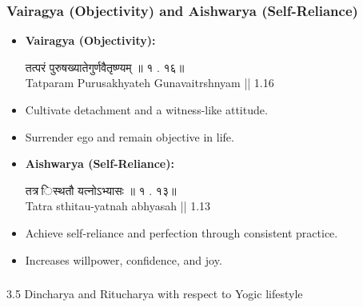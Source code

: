 \begin{frame}[fragile]\frametitle{Vairagya (Objectivity) and Aishwarya (Self-Reliance)}

      \begin{itemize}
        \item \textbf{Vairagya (Objectivity):}
        
        तत्परं   पुरुषख्यातेगुर्णवैतृष्ण्यम्   ॥   १ . १६॥ \\
        Tatparam Purusakhyateh Gunavaitrshnyam || 1.16
        
        \item Cultivate detachment and a witness-like attitude.
        \item Surrender ego and remain objective in life.
        \item \textbf{Aishwarya (Self-Reliance):}
        
        तत्र   िस्थतौ   यत्नोऽभ्यासः   ॥   १ . १३॥ \\
        Tatra sthitau-yatnah abhyasah || 1.13
        
        \item Achieve self-reliance and perfection through consistent practice.
        \item Increases willpower, confidence, and joy.
      \end{itemize}

\end{frame}

\begin{frame}[fragile]\frametitle{}
\begin{center}
{\Large 3.5 Dincharya and Ritucharya with respect to Yogic lifestyle}
\end{center}
\end{frame}

